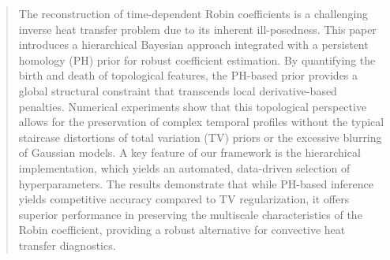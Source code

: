 \documentclass{ws-mplb}
\begin{document}
\begin{abstract}


The reconstruction of time-dependent Robin coefficients is a challenging inverse heat transfer problem due to its inherent ill-posedness. This paper introduces a hierarchical Bayesian approach integrated with a persistent homology (PH) prior for robust coefficient estimation. By quantifying the birth and death of topological features, the PH-based prior provides a global structural constraint that transcends local derivative-based penalties. Numerical experiments show that this topological perspective allows for the preservation of complex temporal profiles without the typical staircase distortions of total variation (TV) priors or the excessive blurring of Gaussian models. A key feature of our framework is the hierarchical implementation, which yields an automated, data-driven selection of hyperparameters. The results demonstrate that while PH-based inference yields competitive accuracy compared to TV regularization, it offers superior performance in preserving the multiscale characteristics of the Robin coefficient, providing a robust alternative for convective heat transfer diagnostics.
\end{abstract}


\end{document}
